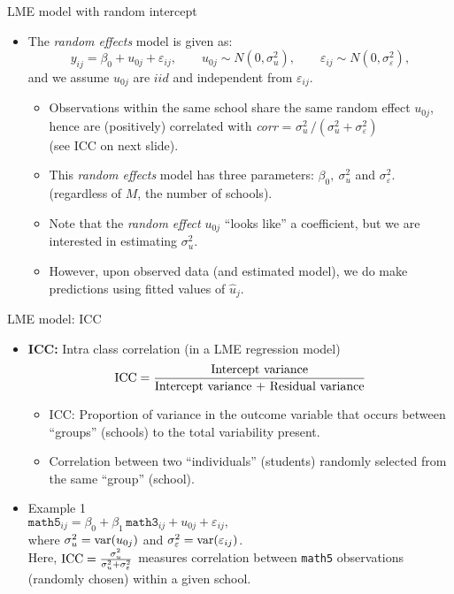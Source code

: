 \documentclass{beamer}
\begin{document}
\begin{frame}{LME model with random intercept}
\begin{itemize}
\item The \textit{random effects} model is given as:
$$ y_{ij} = \beta_{0} + u_{0j} + \varepsilon_{ij}, \qquad u_{0j} \sim N(0,\sigma^2_u), \qquad \varepsilon_{ij} \sim N(0,\sigma^2_{\varepsilon}), $$
and we assume $u_{0j}$ are $iid$ and independent from $\varepsilon_{ij}$.\\
\smallskip
\begin{itemize}
\item Observations within the same school share the same random effect $u_{0j}$, hence are (positively) correlated with \textit{corr} = $\sigma^2_u \, / (\sigma^2_u + \sigma^2_{\varepsilon})$ \\ (see ICC on next slide).
\medskip
\item This \textit{random effects} model has three parameters: $\beta_{0},~ \sigma^2_u$ and $\sigma^2_{\varepsilon}$. (regardless of $M$, the number of schools).
\medskip
\item Note that the \textit{random effect} $u_{0j}$ ``looks like'' a coefficient, but we are interested in estimating $\sigma^2_u$.
\medskip
\item However, upon observed data (and estimated model), we do make predictions using fitted values of $\hat{u}_j$.
\end{itemize}
\end{itemize}
\end{frame}
\begin{frame}{LME model: ICC}
\begin{itemize}
\item \textbf{ICC:} Intra class correlation (in a LME regression model) \qquad
$$ \textnormal{ICC}=\frac{\textnormal{Intercept variance}}{\textnormal{Intercept variance + Residual variance}} $$
\begin{itemize}
    \item ICC: Proportion of variance in the outcome variable that occurs between ``groups'' (schools) to the total variability present.
    \item Correlation between two ``individuals'' (students) randomly selected from the same ``group'' (school).
\end{itemize}
\medskip
\item Example 1\\ \medskip
$\texttt{math5}_{ij} = \beta_{0} + \beta_1 \, \texttt{math3}_{ij} + u_{0j} + \varepsilon_{ij},$\\ \medskip
where $\sigma^2_u = \textnormal{var}(u_{0j})$ and $\sigma^2_{\varepsilon} = \textnormal{var}(\varepsilon_{ij})$.\\ \smallskip
Here, $\textnormal{ICC}=\frac{\sigma^2_u}{\sigma^2_u + \sigma^2_{\varepsilon}}$  measures correlation between \texttt{math5}  observations (randomly chosen) within a given school.
\end{itemize}
\end{frame}
\end{document}
